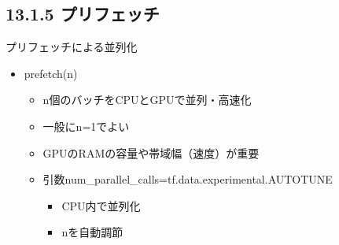 \documentclass[aspectratio=169, dvipdfmx, 14pt, xcolor={svgnames,dvipsnames}, t]{beamer}
\begin{document}

\hypertarget{ux30d7ux30eaux30d5ux30a7ux30c3ux30c1}{%
  \subsection{13.1.5 プリフェッチ}\label{ux30d7ux30eaux30d5ux30a7ux30c3ux30c1}}


\begin{frame}{プリフェッチによる並列化}

  \begin{itemize}
    \tightlist
    \item
          prefetch(n)

          \begin{itemize}
            \tightlist
            \item
                  n個のバッチをCPUとGPUで並列・高速化
            \item
                  一般にn=1でよい
            \item
                  GPUのRAMの容量や帯域幅（速度）が重要
            \item
                  引数num\_parallel\_calls=tf.data.experimental.AUTOTUNE

                  \begin{itemize}
                    \tightlist
                    \item
                          CPU内で並列化
                    \item
                          nを自動調節
                  \end{itemize}
          \end{itemize}
  \end{itemize}

\end{frame}

\end{document}
